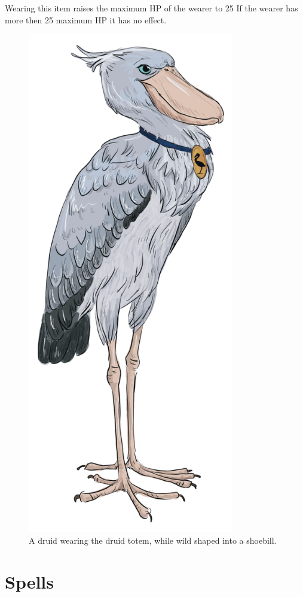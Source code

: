 \documentclass[letter,10pt,twocolumn,openany]{dndbook}
\begin{document}
Wearing this item raises the maximum HP of the wearer to 25
If the wearer has more then 25 maximum HP it has no effect.

\begin{figure}
    \includegraphics[width=9cm]{images/shoebill.png}
    \caption{A druid wearing the druid totem, while wild shaped into a shoebill.}
\end{figure}

\chapter{Spells}
\end{document}
